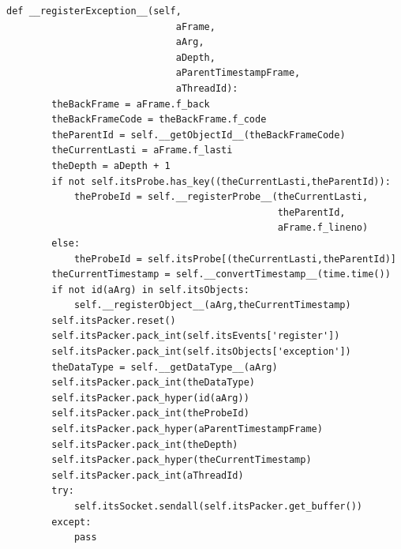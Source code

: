 \documentclass[12pt,legalpaper]{report}
\begin{document}
\begin{singlespace}
\begin{lstlisting}[style=Python]
    def __registerException__(self,
                              aFrame,
                              aArg,
                              aDepth,
                              aParentTimestampFrame,
                              aThreadId):
        theBackFrame = aFrame.f_back
        theBackFrameCode = theBackFrame.f_code
        theParentId = self.__getObjectId__(theBackFrameCode)
        theCurrentLasti = aFrame.f_lasti
        theDepth = aDepth + 1
        if not self.itsProbe.has_key((theCurrentLasti,theParentId)):
            theProbeId = self.__registerProbe__(theCurrentLasti,
                                                theParentId,
                                                aFrame.f_lineno)
        else:
            theProbeId = self.itsProbe[(theCurrentLasti,theParentId)]
        theCurrentTimestamp = self.__convertTimestamp__(time.time())       
        if not id(aArg) in self.itsObjects:
            self.__registerObject__(aArg,theCurrentTimestamp)            
        self.itsPacker.reset()
        self.itsPacker.pack_int(self.itsEvents['register'])
        self.itsPacker.pack_int(self.itsObjects['exception'])       
        theDataType = self.__getDataType__(aArg)
        self.itsPacker.pack_int(theDataType)
        self.itsPacker.pack_hyper(id(aArg))
        self.itsPacker.pack_int(theProbeId)
        self.itsPacker.pack_hyper(aParentTimestampFrame)        
        self.itsPacker.pack_int(theDepth)
        self.itsPacker.pack_hyper(theCurrentTimestamp)
        self.itsPacker.pack_int(aThreadId)
        try:
            self.itsSocket.sendall(self.itsPacker.get_buffer())
        except:
            pass


\end{lstlisting}
\end{singlespace}
\end{document}
